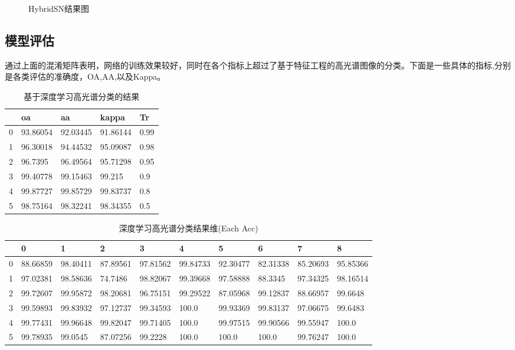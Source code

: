 \documentclass[runningheads]{llncs}
\begin{document}
\begin{figure}[t]
\centering  %
\caption{HybridSN结果图}
\label{1}
\end{figure}

\subsection{模型评估}
通过上面的混淆矩阵表明，网络的训练效果较好，同时在各个指标上超过了基于特征工程的高光谱图像的分类。下面是一些具体的指标,分别是各类评估的准确度，OA,AA,以及Kappa。

%
%
\begin{table}[]
\caption{基于深度学习高光谱分类的结果}
\label{tab:my-table}
\centering
\setlength\tabcolsep{25pt}
\begin{tabular}{lllll}
\toprule
  & oa       & aa       & kappa    & Tr   \\
  \midrule
0 & 93.86054 & 92.03445 & 91.86144 & 0.99 \\
1 & 96.30018 & 94.44532 & 95.09087 & 0.98 \\
2 & 96.7395  & 96.49564 & 95.71298 & 0.95 \\
3 & 99.40778 & 99.15463 & 99.215   & 0.9  \\
4 & 99.87727 & 99.85729 & 99.83737 & 0.8  \\
5 & 98.75164 & 98.32241 & 98.34355 & 0.5  \\
\bottomrule
\end{tabular}
\end{table}
\begin{table}[]
\centering
\setlength\tabcolsep{10pt}
\caption{深度学习高光谱分类结果维(Each Acc)}
\label{tab:my-table}
\begin{tabular}{llllllllll}
\toprule
  & 0        & 1        & 2        & 3        & 4        & 5        & 6        & 7        & 8        \\
  \midrule
0 & 88.66859 & 98.40411 & 87.89561 & 97.81562 & 99.84733 & 92.30477 & 82.31338 & 85.20693 & 95.85366 \\
1 & 97.02381 & 98.58636 & 74.7486  & 98.82067 & 99.39668 & 97.58888 & 88.3345  & 97.34325 & 98.16514 \\
2 & 99.72607 & 99.95872 & 98.20681 & 96.75151 & 99.29522 & 87.05968 & 99.12837 & 88.66957 & 99.6648  \\
3 & 99.59893 & 99.83932 & 97.12737 & 99.34593 & 100.0    & 99.93369 & 99.83137 & 97.06675 & 99.6483  \\
4 & 99.77431 & 99.96648 & 99.82047 & 99.71405 & 100.0    & 99.97515 & 99.90566 & 99.55947 & 100.0    \\
5 & 99.78935 & 99.0545  & 87.07256 & 99.2228  & 100.0    & 100.0    & 100.0    & 99.76247 & 100.0   \\
\bottomrule
\end{tabular}
\end{table}
\end{document}
